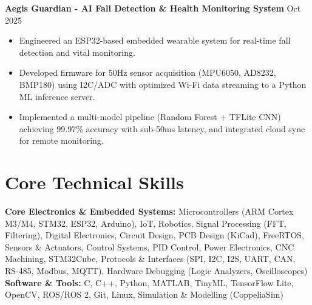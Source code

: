 \documentclass[10pt,a4paper]{article}%
\begin{document}
\noindent \textbf{Aegis Guardian - AI Fall Detection \& Health Monitoring System} \hfill Oct 2025%
\begin{itemize}[leftmargin=15pt, nosep, topsep=0pt]%
\item Engineered an ESP32-based embedded wearable system for real-time fall detection and vital monitoring.%
\item Developed firmware for 50Hz sensor acquisition (MPU6050, AD8232, BMP180) using I2C/ADC with optimized Wi-Fi data streaming to a Python ML inference server.%
\item Implemented a multi-model pipeline (Random Forest + TFLite CNN) achieving 99.97\% accuracy with sub-50ms latency, and integrated cloud sync for remote monitoring.%
\end{itemize} \vspace{8pt}

\section*{Core Technical Skills}%
\noindent \textbf{Core Electronics \& Embedded Systems:} Microcontrollers (ARM Cortex M3/M4, STM32, ESP32, Arduino), IoT, Robotics, Signal Processing (FFT, Filtering), Digital Electronics, Circuit Design, PCB Design (KiCad), FreeRTOS, Sensors \& Actuators, Control Systems, PID Control, Power Electronics, CNC Machining, STM32Cube, Protocols \& Interfaces (SPI, I2C, I2S, UART, CAN, RS-485, Modbus, MQTT), Hardware Debugging (Logic Analyzers, Oscilloscopes) \vspace{6pt}\\%
\noindent \textbf{Software \& Tools:} C, C++, Python, MATLAB, TinyML, TensorFlow Lite, OpenCV, ROS/ROS 2, Git, Linux, Simulation \& Modelling (CoppeliaSim)%
\end{document}
